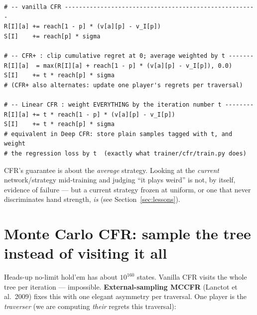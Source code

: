 \documentclass[11pt,a4paper]{article}
\begin{document}
\begin{lstlisting}[style=py, caption={CFR$^{+}$ and Linear CFR are three-line edits to the two update lines.}]
# -- vanilla CFR ------------------------------------------------------
R[I][a] += reach[1 - p] * (v[a][p] - v_I[p])
S[I]    += reach[p] * sigma

# -- CFR+ : clip cumulative regret at 0; average weighted by t -------
R[I][a]  = max(R[I][a] + reach[1 - p] * (v[a][p] - v_I[p]), 0.0)
S[I]    += t * reach[p] * sigma
# (CFR+ also alternates: update one player's regrets per traversal)

# -- Linear CFR : weight EVERYTHING by the iteration number t --------
R[I][a] += t * reach[1 - p] * (v[a][p] - v_I[p])
S[I]    += t * reach[p] * sigma
# equivalent in Deep CFR: store plain samples tagged with t, and weight
# the regression loss by t  (exactly what trainer/cfr/train.py does)
\end{lstlisting}

\begin{trap}
CFR's guarantee is about the \emph{average} strategy. Looking at the
\emph{current} network/strategy mid-training and judging ``it plays weird'' is
not, by itself, evidence of failure --- but a current strategy frozen at
uniform, or one that never discriminates hand strength, \emph{is} (see
Section~\ref{sec:lessons}).
\end{trap}

\section{Monte Carlo CFR: sample the tree instead of visiting it all}

Heads-up no-limit hold'em has about $10^{160}$ states. Vanilla CFR visits the
whole tree per iteration --- impossible. \textbf{External-sampling MCCFR}
(Lanctot et al.\ 2009) fixes this with one elegant asymmetry per traversal.
One player is the \emph{traverser} (we are computing \emph{their} regrets this
traversal):
\end{document}
